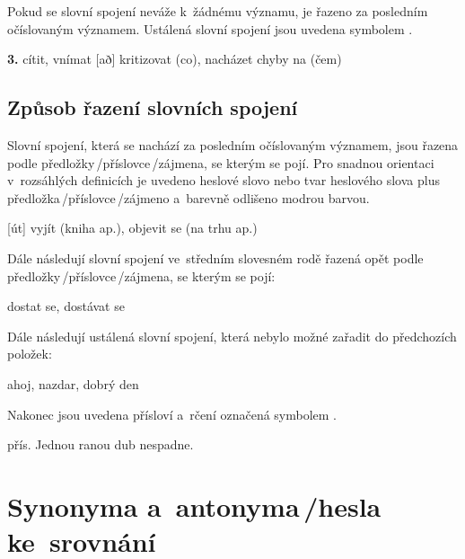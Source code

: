 Pokud se slovní spojení neváže k~žádnému významu, je řazeno za posledním očíslovaným významem. Ustálená slovní spojení jsou uvedena symbolem \dicsymIdiom.

\blspace
  \dicEntry {}   {\textbf{3.}}  {cítit, vnímat} [að] {} {kritizovat (co), nacházet chyby na (čem)}
\blspace

\subsection*{Způsob řazení slovních spojení}

Slovní spojení, která se nachází za posledním očíslovaným významem, jsou řazena podle předložky\,/\addthin příslovce\,/\addthin zájmena, se kterým se pojí. Pro snadnou orientaci v~rozsáhlých definicích je uvedeno heslové slovo nebo tvar heslového slova plus předložka\,/\addthin příslovce\,/\addthin zájmeno a~barevně odlišeno modrou barvou.

\blspace
  \dicEntry {}   [út] {} {vyjít (kniha ap.), objevit se (na trhu ap.)}
\blspace

Dále následují slovní spojení ve~středním slovesném rodě řazená opět podle předložky\,/\addthin příslovce\,/\addthin zájmena, se kterým se pojí:

\blspace
  \dicEntry {}    {}  {dostat se, dostávat se}
\blspace

Dále následují ustálená slovní spojení, která nebylo možné zařadit do předchozích položek:

\blspace
  \dicEntry {}    {} {ahoj, nazdar, dobrý den}
\blspace

Nakonec jsou uvedena přísloví a~rčení označená symbolem {\color{newdev}}.

\blspace
  \dicEntry {}   \dicProverb{}  {\footnotesize{přís.}} {Jednou ranou dub nespadne.}
\blspace

\section{Synonyma a~antonyma\,/\addthin hesla ke~srovnání}
\longsectionskip

